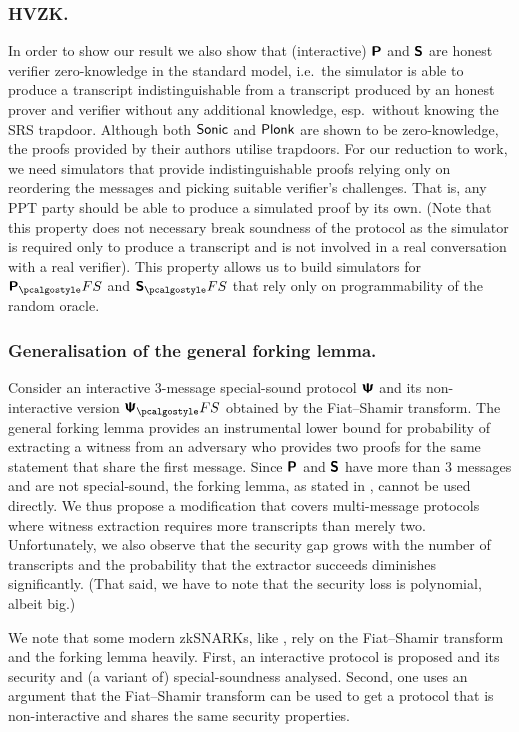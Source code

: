 \documentclass[runningheads,11pt]{llncs}
\begin{document}
\subsubsection{HVZK.}%
In order to show our result we also show that (interactive) $\bm{\mathsf{P}}$ and
$\bm{\mathsf{S}}$ are honest verifier zero-knowledge in the standard model, i.e.~the
simulator is able to produce a transcript indistinguishable from a transcript
produced by an honest prover and verifier without any additional knowledge,
esp.~without knowing the SRS trapdoor. Although both ${\textnormal{\textsf{Sonic}}}$ and $\textnormal{\textsf{Plonk}}$ are
shown to be zero-knowledge, the proofs provided by their authors utilise
trapdoors. For our reduction to work, we need simulators that provide
indistinguishable proofs relying only on reordering the messages
and picking suitable verifier's challenges. That is, any PPT party should be
able to produce a simulated proof by its own. (Note that this property does not
necessary break soundness of the protocol as the simulator is required only to
produce a transcript and is not involved in a real conversation with a real
verifier). This property allows us to build simulators for $\plonkprotfs$ and
$\sonicprotfs$ that rely only on programmability of the random oracle.

\subsubsection{Generalisation of the general forking lemma.}
Consider an interactive $3$-message special-sound protocol $\bm{\mathsf{\Psi}}$ and its
non-interactive version $\ps_\fs$ obtained by the Fiat--Shamir transform. The
general forking lemma provides an instrumental lower bound for probability of
extracting a witness from an adversary who provides two proofs for the same
statement that share the first message. Since $\bm{\mathsf{P}}$ and $\bm{\mathsf{S}}$ have
more than $3$ messages and are not special-sound, the forking lemma, as stated
in \cite{CCS:BelNev06}, cannot be used directly. We thus propose a modification
that covers multi-message protocols where witness extraction requires more
transcripts than merely two.  Unfortunately, we also observe that the security
gap grows with the number of transcripts and the probability that the extractor
succeeds diminishes significantly. (That said, we have to note that the security
loss is polynomial, albeit big.)

We note that some modern zkSNARKs, like \cite{SP:BBBPWM18,CCS:MBKM19}, rely on
the Fiat--Shamir transform and the forking lemma heavily. First, an interactive
protocol is proposed and its security and (a variant of) special-soundness analysed. Second,
one uses an argument that the Fiat--Shamir transform can be used to get a
protocol that is non-interactive and shares the same security properties.
\end{document}
